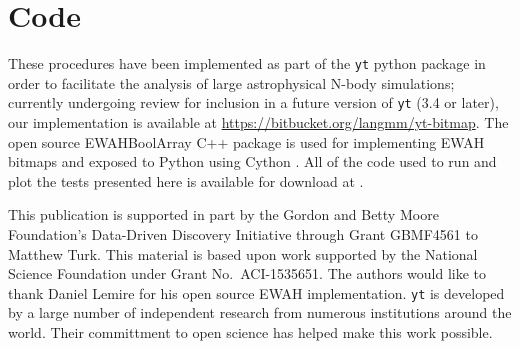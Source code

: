 \documentclass[apjl]{emulateapj}
\newcommand{\todo}[1]{{\color{red}{#1}}}
\begin{document}
\section{Code}\label{S:code}
These procedures have been implemented as part of the {\tt yt} python package
\citep{Turk20d11a} in order to facilitate the analysis of large astrophysical
N-body simulations; currently undergoing review for inclusion in a future version of {\tt yt} (3.4 or later), our implementation is available at \url{https://bitbucket.org/langmm/yt-bitmap}. The open source EWAHBoolArray C++ package is used for implementing EWAH bitmaps \citep{Lemire2010,Kaser2016} and exposed to Python using Cython \citep{Behnel2011}. All of the code used to run and plot the tests presented here is available for download at \todo{website}.

\acknowledgments
This publication is supported in part by the Gordon and Betty Moore
Foundation’s Data-Driven Discovery Initiative through Grant GBMF4561 to Matthew
Turk.  This material is based upon work supported by the National Science
Foundation under Grant No.~ACI-1535651.  The authors would like to thank Daniel
Lemire for his open source EWAH implementation.  {\tt yt} is developed by a
large number of independent research from numerous institutions around the
world.  Their committment to open science has helped make this work possible.

\ifdraft
	
\else
	
\fi

\ifplacefig
\else
\fi

\end{document}
